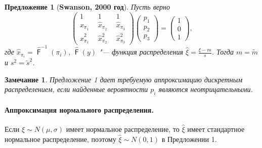 \documentclass[12pt]{article}
\newtheorem{proposition}[theorem]{Предложение}
\newtheorem{zam}{Замечание}
\DeclareMathOperator{\F}{\mathsf{F}}
\begin{document}
	\begin{proposition}[\textbf{Swanson, 2000 год}]\label{pr1}
		Пусть верно 
		\begin{equation}
			\begin{pmatrix} 
				1&1&1\\ 
				\hat{x}_{\pi_{1}}~~ &  \hat{x}_{\pi_{2}}~~  & \hat{x}_{\pi_{3}} \\ 
				\hat{x}_{\pi_{1}}^{2}~~&\hat{x}_{\pi_{2}}^{2}~~  &\hat{x}_{\pi_{3}}^{2}
			\end{pmatrix}
			\begin{pmatrix}p_{1}\\p_{2}\\ p_{3}\end{pmatrix}= \begin{pmatrix}1\\0\\1 \end{pmatrix},\label{4}
		\end{equation}
		где $\hat{x}_{\pi_{i}} = \hat{\F}^{-1}(\pi_{i})$, $\hat{\F}(y)$ "--- функция распределения $\displaystyle{\hat{\xi} = \frac{\xi-m}{s}}$. Тогда $m=\tilde{m}$ и $s^{2} = \tilde{s}^{2}$.
	\end{proposition}
	
	\begin{zam}
		Предложение 1 дает требуемую аппроксимацию дискретным распределением, если найденные вероятности $p_{i}$ являются неотрицательными.
	\end{zam}
	
	\paragraph{Аппроксимация нормального распределения.}
	Если $\xi\sim N(\mu, \sigma) $ имеет нормальное распределение, то
	$\hat{\xi}$ имеет стандартное нормальное распределение, поэтому $\hat{\xi}\sim N(0, 1)$ в Предложении 1.
	
\end{document}
